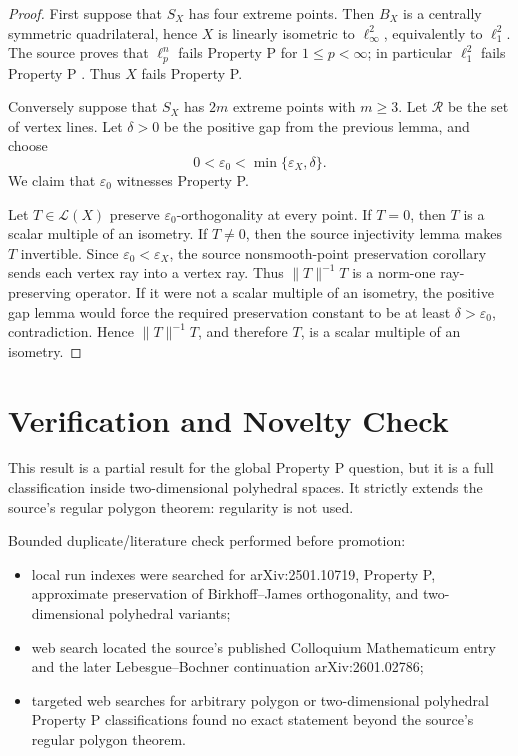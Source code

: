 \documentclass[11pt]{article}
\newcommand{\eps}{\varepsilon}
\newcommand{\cL}{\mathcal L}
\begin{document}
\begin{proof}
First suppose that \(S_X\) has four extreme points.  Then \(B_X\) is a
centrally symmetric quadrilateral, hence \(X\) is linearly isometric to
\(\ell_\infty^2\), equivalently to \(\ell_1^2\).  The source proves that
\(\ell_p^n\) fails Property P for \(1\leq p<\infty\); in particular
\(\ell_1^2\) fails Property P \cite[Corollary 2.27]{MMPS}.  Thus \(X\) fails
Property P.

Conversely suppose that \(S_X\) has \(2m\) extreme points with \(m\geq3\).
Let \(\mathcal R\) be the set of vertex lines.  Let \(\delta>0\) be the positive
gap from the previous lemma, and choose
\[
  0<\eps_0<\min\{\eps_X,\delta\}.
\]
We claim that \(\eps_0\) witnesses Property P.

Let \(T\in\cL(X)\) preserve \(\eps_0\)-orthogonality at every point.  If
\(T=0\), then \(T\) is a scalar multiple of an isometry.  If \(T\neq0\), then
the source injectivity lemma makes \(T\) invertible.  Since
\(\eps_0<\eps_X\), the source nonsmooth-point preservation corollary sends each
vertex ray into a vertex ray.  Thus \(\|T\|^{-1}T\) is a norm-one
ray-preserving operator.  If it were not a scalar multiple of an isometry, the
positive gap lemma would force the required preservation constant to be at least
\(\delta>\eps_0\), contradiction.  Hence \(\|T\|^{-1}T\), and therefore \(T\),
is a scalar multiple of an isometry.
\end{proof}

\section*{Verification and Novelty Check}

This result is a partial result for the global Property P question, but it is a
full classification inside two-dimensional polyhedral spaces.  It strictly
extends the source's regular polygon theorem: regularity is not used.

Bounded duplicate/literature check performed before promotion:
\begin{itemize}
  \item local run indexes were searched for arXiv:2501.10719, Property P,
  approximate preservation of Birkhoff--James orthogonality, and two-dimensional
  polyhedral variants;
  \item web search located the source's published Colloquium Mathematicum entry
  and the later Lebesgue--Bochner continuation arXiv:2601.02786;
  \item targeted web searches for arbitrary polygon or two-dimensional
  polyhedral Property P classifications found no exact statement beyond the
  source's regular polygon theorem.
\end{itemize}
\end{document}
